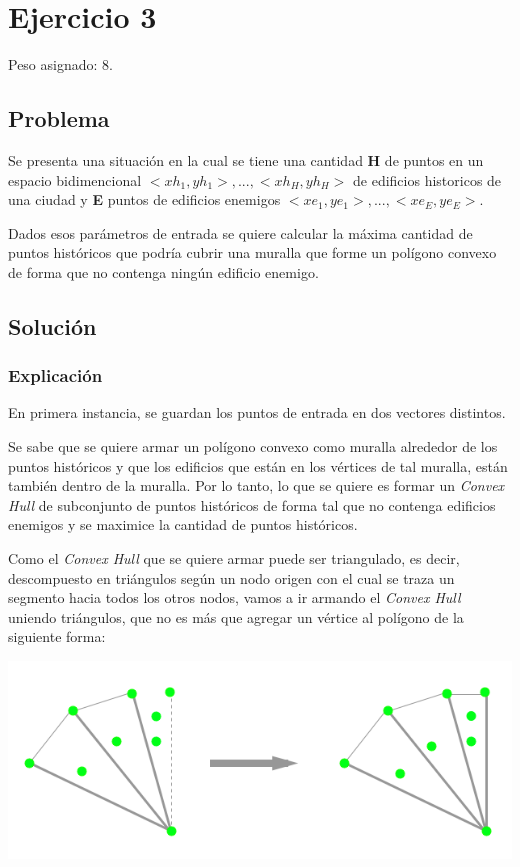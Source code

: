 \section{Ejercicio 3}

Peso asignado: 8.

\subsection{Problema}

Se presenta una situación en la cual se tiene una cantidad \textbf{H} de puntos en un espacio bidimencional
$<xh_1,yh_1>,...,<xh_H,yh_H>$ de edificios historicos de una ciudad y \textbf{E} puntos de edificios
enemigos $<xe_1,ye_1>,...,<xe_E,ye_E>$.

Dados esos parámetros de entrada se quiere calcular la máxima cantidad de puntos históricos que podría cubrir
una muralla que forme un polígono convexo de forma que no contenga ningún edificio enemigo.

\subsection{Solución}

\subsubsection{Explicación}

En primera instancia, se guardan los puntos de entrada en dos vectores distintos.

Se sabe que se quiere armar un polígono convexo como muralla alrededor de los puntos históricos y que los
edificios que están en los vértices de tal muralla, están también dentro de la muralla. Por lo tanto, lo
que se quiere es formar un \textit{Convex Hull} de subconjunto de puntos históricos de forma tal que no
contenga edificios enemigos y se maximice la cantidad de puntos históricos.

Como el \textit{Convex Hull} que se quiere armar puede ser triangulado, es decir, descompuesto en triángulos
según un nodo origen con el cual se traza un segmento hacia todos los otros nodos, vamos a ir armando el
\textit{Convex Hull} uniendo triángulos, que no es más que agregar un vértice al polígono de la siguiente forma:

\includegraphics[scale=0.5]{img/ej31.png}

